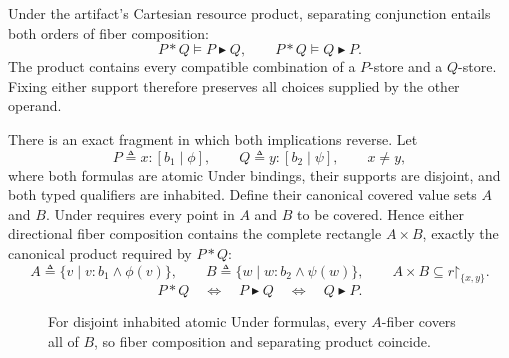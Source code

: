 \documentclass[10pt]{ctexart}
\newcommand{\restr}{\mathord{\upharpoonright}}
\newcommand{\rfcomp}{\mathbin{\blacktriangleright}}
\newcommand{\modelsr}{\mathrel{\models}}
\begin{document}
Under the artifact's Cartesian resource product, separating conjunction
entails both orders of fiber composition:
\begin{equation}\label{eq:star-to-fiber}
  P*Q\modelsr P\rfcomp Q,
  \qquad
  P*Q\modelsr Q\rfcomp P.
\end{equation}
The product contains every compatible combination of a $P$-store and a
$Q$-store.  Fixing either support therefore preserves all choices supplied by
the other operand.

There is an exact fragment in which both implications reverse.  Let
\[
  P\triangleq x:[b_1\mid\phi],
  \qquad
  Q\triangleq y:[b_2\mid\psi],
  \qquad x\neq y,
\]
where both formulas are atomic Under bindings, their supports are disjoint,
and both typed qualifiers are inhabited.  Define their canonical covered
value sets $A$ and $B$.  Under requires every point in $A$ and $B$ to be
covered.  Hence either directional fiber composition contains the complete
rectangle $A\times B$, exactly the canonical product required by $P*Q$:
\[
  A\triangleq\{v\mid v:b_1\land\phi(v)\},
  \qquad
  B\triangleq\{w\mid w:b_2\land\psi(w)\},
  \qquad
  A\times B\subseteq r\restr_{\{x,y\}}.
\]
\begin{equation}\label{eq:under-equivalence}
  P*Q
  \quad\Longleftrightarrow\quad
  P\rfcomp Q
  \quad\Longleftrightarrow\quad
  Q\rfcomp P.
\end{equation}

\begin{figure}[H]
\centering
{}
\caption{For disjoint inhabited atomic Under formulas, every $A$-fiber covers
all of $B$, so fiber composition and separating product coincide.}
\label{fig:under-rectangle}
\end{figure}
\end{document}
